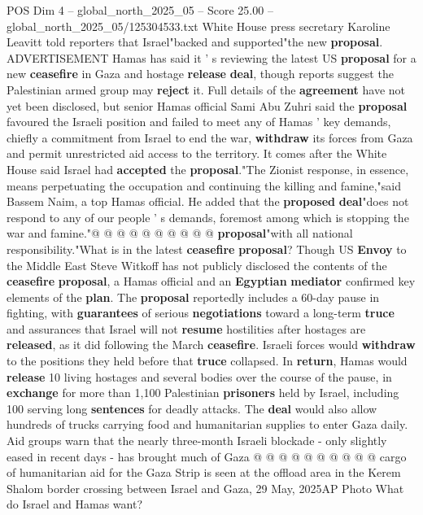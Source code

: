 \begin{textsample}{POS Dim 4 – global\_north\_2025\_05 – Score 25.00 – global\_north\_2025\_05/125304533.txt}  \label{ex:f4_pos_215}
White House press secretary Karoline Leavitt told reporters that Israel"backed and supported"the new \textbf{proposal}.
ADVERTISEMENT Hamas has said it ' s reviewing the latest US \textbf{proposal} for a new \textbf{ceasefire} in Gaza and hostage \textbf{release} \textbf{deal}, though reports suggest the Palestinian armed group may \textbf{reject} it.
Full details of the \textbf{agreement} have not yet been disclosed, but senior Hamas official Sami Abu Zuhri said the \textbf{proposal} favoured the Israeli position and failed to meet any of Hamas ' key demands, chiefly a commitment from Israel to end the war, \textbf{withdraw} its forces from Gaza and permit unrestricted aid access to the territory.
It comes after the White House said Israel had \textbf{accepted} the \textbf{proposal}."The Zionist response, in essence, means perpetuating the occupation and continuing the killing and famine,"said Bassem Naim, a top Hamas official.
He added that the \textbf{proposed} \textbf{deal}"does not respond to any of our people ' s demands, foremost among which is stopping the war and famine."@ @ @ @ @ @ @ @ @ @ \textbf{proposal}"with all national responsibility."What is in the latest \textbf{ceasefire} \textbf{proposal}?
Though US \textbf{Envoy} to the Middle East Steve Witkoff has not publicly disclosed the contents of the \textbf{ceasefire} \textbf{proposal}, a Hamas official and an \textbf{Egyptian} \textbf{mediator} confirmed key elements of the \textbf{plan}.
The \textbf{proposal} reportedly includes a 60-day pause in fighting, with \textbf{guarantees} of serious \textbf{negotiations} toward a long-term \textbf{truce} and assurances that Israel will not \textbf{resume} hostilities after hostages are \textbf{released}, as it did following the March \textbf{ceasefire}.
Israeli forces would \textbf{withdraw} to the positions they held before that \textbf{truce} collapsed.
In \textbf{return}, Hamas would \textbf{release} 10 living hostages and several bodies over the course of the pause, in \textbf{exchange} for more than 1,100 Palestinian \textbf{prisoners} held by Israel, including 100 serving long \textbf{sentences} for deadly attacks.
The \textbf{deal} would also allow hundreds of trucks carrying food and humanitarian supplies to enter Gaza daily.
Aid groups warn that the nearly three-month Israeli blockade - only slightly eased in recent days - has brought much of Gaza @ @ @ @ @ @ @ @ @ @ cargo of humanitarian aid for the Gaza Strip is seen at the offload area in the Kerem Shalom border crossing between Israel and Gaza, 29 May, 2025AP Photo What do Israel and Hamas want?

\end{textsample}
